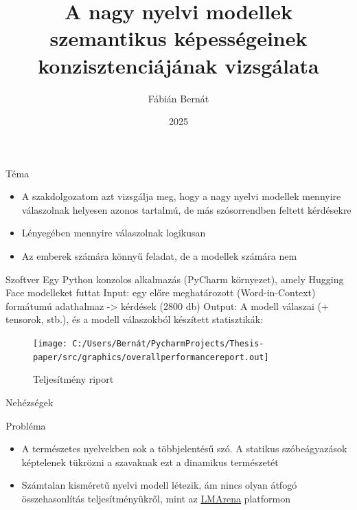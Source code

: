 \documentclass{beamer}
\title{\bf A nagy nyelvi modellek szemantikus képességeinek konzisztenciájának vizsgálata}
\author{Fábián Bernát}
\institute{Programtervező Informatikus BSc\\Szegedi Tudományegyetem}
\date{2025}
\begin{document}
    \frame{\titlepage}

    \begin{frame}{Téma}
        \begin{itemize}
            \item A szakdolgozatom azt vizsgálja meg, hogy a nagy nyelvi modellek mennyire válaszolnak helyesen azonos tartalmú, de más szósorrendben feltett kérdésekre
            \item Lényegében mennyire válaszolnak logikusan
            \item Az emberek számára könnyű feladat, de a modellek számára nem
        \end{itemize}

    \end{frame}

    \begin{frame}{Szoftver}
        Egy Python konzolos alkalmazás (PyCharm környezet), amely Hugging Face modelleket futtat
        Input: egy előre meghatározott (Word-in-Context) formátumú adathalmaz -> kérdések (2800 db)
        Output: A modell válaszai (+ tensorok, stb.), és a modell válaszokból készített statisztikák:
        \begin{figure}
            \centering
            \texttt{[image: C:/Users/Bernát/PycharmProjects/Thesis-paper/src/graphics/overallperformancereport.out]}
            \caption{Teljesítmény riport}
            \label{fig:overallperformancereport.out}
        \end{figure}
    \end{frame}

    \begin{frame}{Nehézségek}

    \end{frame}

    \begin{frame}{Probléma}
        \begin{itemize}
            \item A természetes nyelvekben sok a többjelentésű szó. A statikus szóbeágyazások képtelenek tükrözni a szavaknak ezt a dinamikus természetét
            \item Számtalan kisméretű nyelvi modell létezik, ám nincs olyan átfogó összehasonlítás teljesítményükről, mint az \href{https://lmarena.ai/}{LMArena} platformon
        \end{itemize}
    \end{frame}
\end{document}
